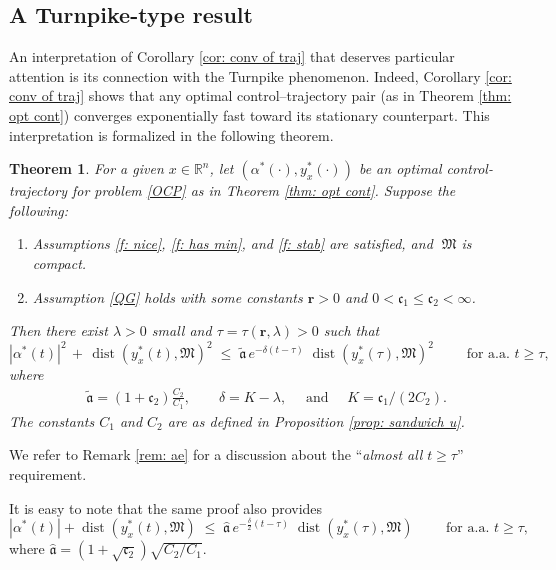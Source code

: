 \documentclass[12pt]{amsart}
\numberwithin{equation}{section}
\theoremstyle{plain}
\newtheorem{theorem}{Theorem}[section]
\begin{document}
\subsection{A Turnpike-type result}

An interpretation of Corollary \ref{cor: conv of traj} that deserves particular attention is its connection with the Turnpike phenomenon. Indeed, Corollary \ref{cor: conv of traj} shows that any optimal control–trajectory pair (as in Theorem \ref{thm: opt cont}) converges exponentially fast toward its stationary counterpart. This interpretation is formalized in the following theorem.


\begin{theorem}\label{thm: turnpike}
For a given $x\in\mathbb{R}^{n}$, let $(\alpha^{*}(\cdot), y_{x}^{*}(\cdot))$ be an optimal control-trajectory for problem \eqref{OCP} as in Theorem \ref{thm: opt cont}. Suppose the following: 
\begin{enumerate}[label = -]
    \item Assumptions \ref{f: nice}, \ref{f: has min}, and \ref{f: stab} are satisfied, and $\;\mathfrak{M}$ is compact.
    \item Assumption \ref{QG} holds  with some constants $\mathbf{r}>0$ and $0<\mathfrak{c}_{1}\leq \mathfrak{c}_{2}<\infty$.
\end{enumerate}
Then there exist $\lambda>0$ small and $\tau = \tau(\mathbf{r}, \lambda)>0$ such that 
\begin{equation*}
    |\alpha^{*}(t)|^{2} \,+\, \operatorname{dist}(y_{x}^{*}(t),\mathfrak{M})^{2} 
    \; \leq \;  
    \tilde{\mathfrak{a}}\,e^{-\delta(t-\tau)}\;\operatorname{dist}(y_{x}^{*}(\tau),\mathfrak{M})^{2}  \quad \quad \text{ for a.a. } t\geq\tau,
\end{equation*}
where
\begin{equation*}
\begin{aligned}
    & \tilde{\mathfrak{a}} = (1+\mathfrak{c}_{2})\frac{C_{2}}{C_{1}}, \quad  \quad \delta = K - \lambda, \quad \text{ and } \quad K=\mathfrak{c}_{1}/(2C_{2}).
\end{aligned}
\end{equation*}
The constants $C_{1}$ and $C_{2}$ are as defined in Proposition \ref{prop: sandwich u}.
\end{theorem}

We refer to Remark \ref{rem: ae} for a discussion about the ``\textit{almost all} $t\geq \tau$'' requirement.

It is easy to note that the same proof also provides
\begin{equation*}
    |\alpha^{*}(t)| + \operatorname{dist}(y_{x}^{*}(t),\mathfrak{M}) 
    \; \leq \;  
    \hat{\mathfrak{a}}\,e^{-\frac{\delta}{2}(t-\tau)}\;\operatorname{dist}(y_{x}^{*}(\tau),\mathfrak{M})  \quad \quad \text{ for a.a. } t\geq\tau,
\end{equation*}
where $\hat{\mathfrak{a}} = (1+\sqrt{\mathfrak{c}_{2}})\sqrt{C_{2}/C_{1}}$.
\end{document}
